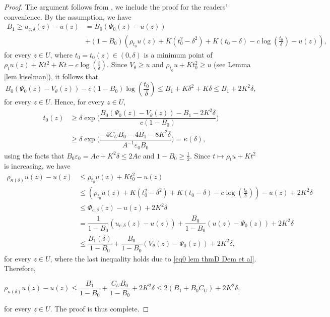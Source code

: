 \documentclass[a4paper,11pt]{amsart}
\numberwithin{equation}{section}
\theoremstyle{definition}
\begin{document}
\begin{proof}The argument follows from \cite[pages 642-643]{demailly2014holder}, we include the proof
for the readers’ convenience.
	By the assumption, we have
\begin{align*}
B_1\geq u_{c, \delta}(z)-u(z)&=B_0(\Psi_0(z)-u(z))\\
&+
(1-B_0)\left(\rho_{t_0}u(z)+K(t_0^2-\delta^2)+K(t_0-\delta)-c\log\left(\frac{t_0}{\delta}\right)-u(z)\right),	
\end{align*}
for every $z\in U$, where $t_0=t_0(z)\in (0, \delta)$ is a minimum point of 
$\rho_{t}u(z)+Kt^2+Kt-c\log\left(\frac{t}{\delta}\right)$. Since $V_{\theta}\geq u$
and $\rho_{t_0}u+Kt_0^2\geq u$ (see Lemma \ref{lem kiselman}), it follows that
$$B_0(\Psi_0(z)-V_{\theta}(z))
-c(1-B_0)\log\left(\frac{t_0}{\delta}\right)\leq  B_1+K\delta^2+K\delta\leq B_1+2K^2\delta,$$
for every $z\in U$. Hence, for every $z\in U$,
\begin{align*}
t_0(z)&\geq \delta\exp\bigg(\dfrac{B_0(\Psi_0(z)-V_{\theta}(z))-B_1-2K^2\delta}{c(1-B_0)} \bigg)\\
&\geq \delta\exp\Big(\dfrac{-4C_UB_0-4B_1-8K^2\delta}{A^{-1}\varepsilon_0B_0} \Big)
= \kappa(\delta),
\end{align*}
 using the facts that $B_0\varepsilon_0=Ac+K^2\delta\leq 2Ac$ and $1-B_0\geq \frac{1}{2}$. Since $t\mapsto \rho_tu+Kt^2$ is increasing, we have
\begin{align*}
    \rho_{\kappa(\delta)}u(z)-u(z)
	&\leq \rho_{t_0}u(z)+Kt_0^2-u(z)\\
		&\leq \left(\rho_{t_0}u(z)+K(t_0^2-\delta^2)+K(t_0-\delta)-c\log\left(\frac{t_0}{\delta}\right)\right)-u(z)+2K^2\delta\\
	&\leq \Phi_{c,\delta}(z)-u(z)+2K^2\delta\\
	&=\dfrac{1}{1-B_0}(u_{c, \delta}(z)-u(z))+\dfrac{B_0}{1-B_0}(u(z)-\Psi_0(z))+2K^2\delta\\
	&\leq \dfrac{B_1(\delta)}{1-B_0}+\dfrac{B_0}{1-B_0}(V_{\theta}(z)-\Psi_0(z))+2K^2\delta,
\end{align*}	
for every $z\in U$, where the last inequality holds due to \eqref{eq0 lem thmD Dem et al}. Therefore,
\begin{center}
	$\rho_{\kappa(\delta)}u(z)-u(z)\leq \dfrac{B_1}{1-B_0}+\dfrac{C_UB_0}{1-B_0}+2K^2\delta\leq 2(B_1+B_0C_U)+2K^2\delta,$
\end{center}
for every $z\in U$.
The proof is thus complete.
\end{proof}
\end{document}
